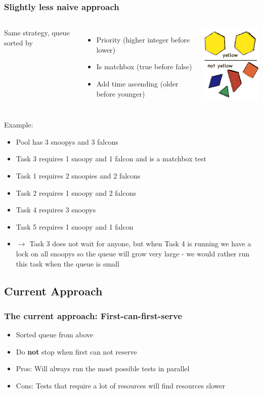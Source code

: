\documentclass[xcolor=pdftex,dvipsnames,table]{beamer}
\begin{document}
\begin{frame}
\frametitle{Slightly less naive approach}
\begin{columns}[cc]
\column{2.0in}
Same strategy, queue sorted by
\begin{itemize}
  \item Priority (higher integer before lower)
  \item Is matchbox (true before false)
  \item Add time ascending (older before younger)
\end{itemize}
\column{0.5in}
\includegraphics[scale=0.50]{sort.png}
\end{columns}
\end{frame}

\begin{frame}
Example:
\begin{itemize}
  \item Pool has 3 snoopys and 3 falcons
  \item Task 3 requires 1 snoopy and 1 falcon and is a matchbox test
  \item Task 1 requires 2 snoopies and 2 falcons
  \item Task 2 requires 1 snoopy and 2 falcons
  \item Task 4 requires 3 snoopys
  \item Task 5 requires 1 snoopy and 1 falcon
  \item $\rightarrow$ Task 3 does not wait for anyone, but when Task 4
    is running we have a lock on all snoopys so the queue will grow
    very large - we would rather run this task when the queue is small
\end{itemize}
\end{frame}

\subsection{Current Approach}

\begin{frame}
\frametitle{The current approach: First-can-first-serve}
\begin{itemize}
  \item Sorted queue from above

  \item Do \textbf{not} stop when first can not reserve
  \item Pros: Will always run the most possible tests in parallel
  \item Cons: Tests that require a lot of resources will find
    resources slower
\end{itemize}
\end{frame}
\end{document}
